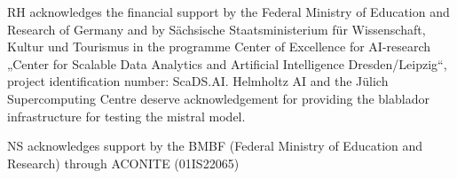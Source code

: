 \documentclass{ecai}
\begin{document}
\begin{ack}
RH acknowledges the financial support by the Federal Ministry of Education and Research of Germany and by Sächsische Staatsministerium für Wissenschaft, Kultur und Tourismus in the programme Center of Excellence for AI-research „Center for Scalable Data Analytics and Artificial Intelligence Dresden/Leipzig“, project identification number: ScaDS.AI.
Helmholtz AI and the Jülich Supercomputing Centre deserve acknowledgement for providing the blablador infrastructure for testing the mistral model.

NS acknowledges support by the BMBF (Federal Ministry of Education and Research) through ACONITE (01IS22065)

\end{ack}




\end{document}
